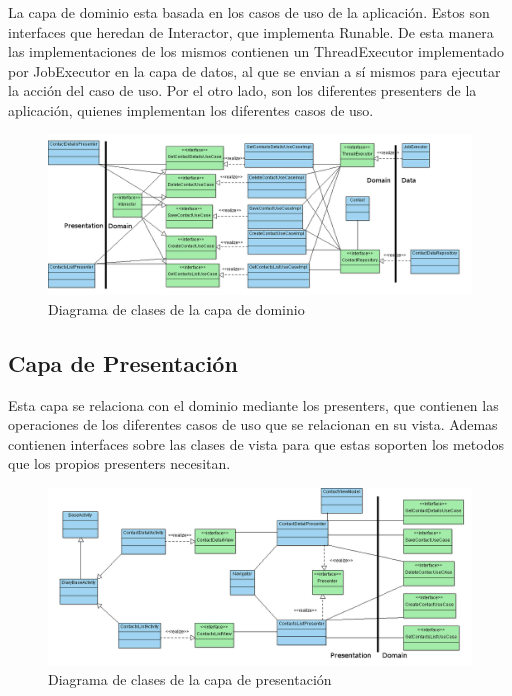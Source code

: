 \documentclass[../pfc.tex]{subfiles}
\begin{document}
	La capa de dominio esta basada en los casos de uso de la aplicación. Estos son interfaces que heredan de Interactor, que implementa Runable. De esta manera las implementaciones de los mismos contienen un ThreadExecutor implementado por JobExecutor en la capa de datos, al que se envian a sí mismos para ejecutar la acción del caso de uso. Por el otro lado, son los diferentes presenters de la aplicación, quienes implementan los diferentes casos de uso. 
	
		\begin{figure}[H]
			\centering
			\includegraphics[width=0.8\linewidth]{../images/DomainClasesDiagram}
			\caption{Diagrama de clases de la capa de dominio}
			\label{fig:Clases de la capa Domain}
		\end{figure}
	
	\subsection{Capa de Presentación}
	
	Esta capa se relaciona con el dominio mediante los presenters, que contienen las operaciones de los diferentes casos de uso que se relacionan en su vista. Ademas contienen interfaces sobre las clases de vista para que estas soporten los metodos que los propios presenters necesitan.
	
		\begin{figure}[H]
			\centering
			\includegraphics[width=0.8\linewidth]{../images/PresentationClasesDiagram}
			\caption{Diagrama de clases de la capa de presentación}
			\label{fig:Clases de la capa Presentation}
		\end{figure}
	
\end{document}
